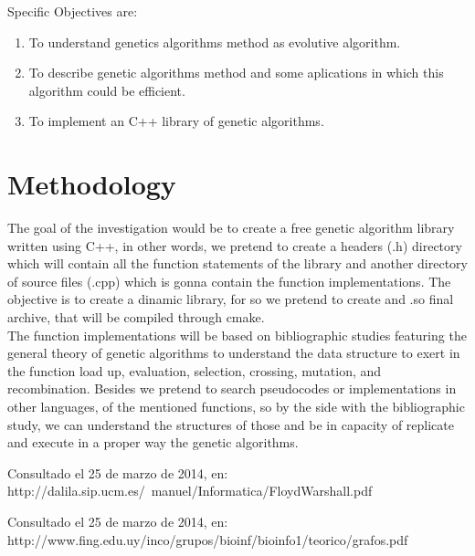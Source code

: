 \documentclass[letterpaper]{article}
\begin{document}
Specific Objectives are:\\

\begin{enumerate}
\item To understand genetics algorithms method as evolutive algorithm.
\item To describe genetic algorithms method and some aplications in which this algorithm could be efficient.
\item To implement an C++ library of genetic algorithms.
\end{enumerate}

\section{Methodology}


The goal of the investigation would be to create a free genetic algorithm library written using C++, in other words, we pretend to create a headers (.h) directory which will contain all the function statements of the library and another directory of source files (.cpp) which is gonna contain the function implementations. The objective is to create a dinamic library, for so we pretend to create and .so final archive, that will be compiled through cmake.
\\
The function implementations will be based on bibliographic studies featuring the general theory of genetic algorithms to understand the data structure to exert in the function load up, evaluation, selection, crossing, mutation, and recombination. Besides we pretend to search pseudocodes or implementations in other languages, of the mentioned functions, so by the side with the bibliographic study, we can understand the structures of those and be in capacity of replicate and execute in a proper way the genetic algorithms.
\\



\begin{thebibliography}{99}
Consultado el 25 de marzo de 2014, en: http://dalila.sip.ucm.es/~manuel/Informatica/FloydWarshall.pdf

Consultado el 25 de marzo de 2014, en: http://www.fing.edu.uy/inco/grupos/bioinf/bioinfo1/teorico/grafos.pdf

\end{thebibliography}
\end{document}
